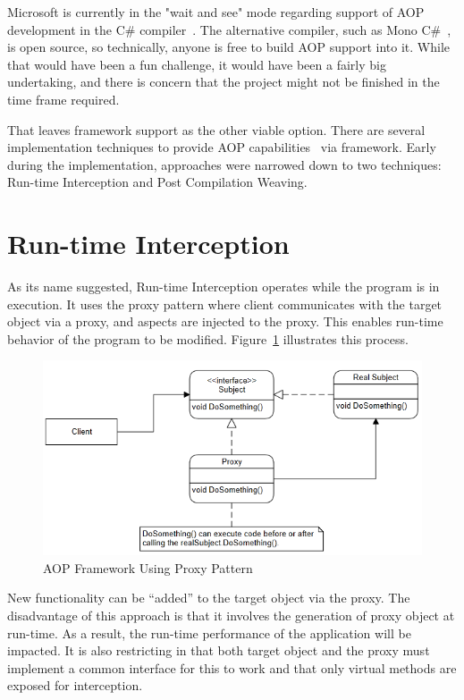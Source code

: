 Microsoft is currently in the "wait and see" mode regarding support of AOP development in the C\# compiler~\cite{hejlsberg}. The alternative compiler, such as Mono C\#~\cite{monocsharp}, is open source, so technically, anyone is free to build AOP support into it. While that would have been a fun challenge, it would have been a fairly big undertaking, and there is concern that the project might not be finished in the time frame required.

That leaves framework support as the other viable option. There are several implementation techniques to provide AOP capabilities~\cite{aopcs, postsharp, aspectcs} via framework. Early during the implementation, approaches were narrowed down to two techniques: Run-time Interception and Post Compilation Weaving.

\section{Run-time Interception}

As its name suggested, Run-time Interception operates while the program is in execution. It uses the proxy pattern where client communicates with the target object via a proxy, and aspects are injected to the proxy. This enables run-time behavior of the program to be modified. Figure~\ref{proxy_model} illustrates this process.

\begin{figure}[H]
  \includegraphics[scale=1.0]{Proxy3.PNG}
  \centering
  \caption{AOP Framework Using Proxy Pattern\label{proxy_model}}
\end{figure}

New functionality can be “added” to the target object via the proxy. The disadvantage of this approach is that it involves the generation of proxy object at run-time. As a result, the run-time performance of the application will be impacted. It is also restricting in that both target object and the proxy must implement a common interface for this to work and that only virtual methods are exposed for interception.

